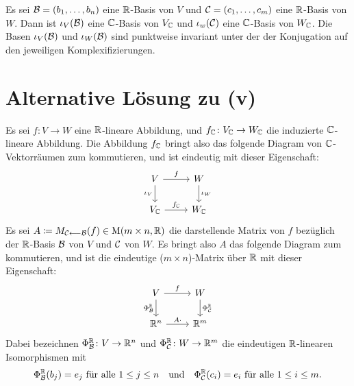 \documentclass[a4paper,10pt]{article}
\begin{document}
Es sei $\mathcal{B} = (b_1, \dotsc, b_n)$ eine $\mathbb{R}$-Basis von $V$ und $\mathcal{C} = (c_1, \dotsc, c_m)$ eine $\mathbb{R}$-Basis von $W$.
Dann ist $\iota_V(\mathcal{B})$ eine $\mathbb{C}$-Basis von $V_{\mathbb{C}}$ und $\iota_w(\mathcal{C})$ eine $\mathbb{C}$-Basis von $W_{\mathbb{C}}$.
Die Basen $\iota_V(\mathcal{B})$ und $\iota_W(\mathcal{B})$ sind punktweise invariant unter der der Konjugation auf den jeweiligen Komplexifizierungen.











\section{Alternative Lösung zu (v)}

Es sei $f \colon V \to W$ eine $\mathbb{R}$-lineare Abbildung, und $f_{\mathbb{C}} \colon V_{\mathbb{C}} \to W_{\mathbb{C}}$ die induzierte $\mathbb{C}$-lineare Abbildung.
Die Abbildung $f_{\mathbb{C}}$ bringt also das folgende Diagram von $\mathbb{C}$-Vektorräumen zum kommutieren, und ist eindeutig mit dieser Eigenschaft:
\[
  \begin{tikzcd}
      V       \arrow[r, "f"]      \arrow[d, "\iota_V"']
    & W                           \arrow[d, "\iota_W"]
    \\
      V_\Cbb  \arrow[r, "f_\Cbb"]
    & W_\Cbb
  \end{tikzcd}
\]
Es sei $A \coloneqq M_{\mathcal{C} \longleftarrow \mathcal{B}}(f) \in \operatorname{M}(m \times n, \mathbb{R})$ die darstellende Matrix von $f$ bezüglich der $\mathbb{R}$-Basis $\mathcal{B}$ von $V$ und $\mathcal{C}$ von $W$.
Es bringt also $A$ das folgende Diagram zum kommutieren, und ist die eindeutige ($m \times n$)-Matrix über $\mathbb{R}$ mit dieser Eigenschaft:
\[
  \begin{tikzcd}
      V      \arrow[r, "f"]       \arrow[d, "\Phi^\Rbb_\mc{B}"']
    & W                           \arrow[d, "\Phi^\Rbb_\mc{C}"]
    \\
      \Rbb^n \arrow[r, "A \cdot"]
    & \Rbb^m
  \end{tikzcd}
\]
Dabei bezeichnen $\Phi^{\mathbb{R}}_{\mathcal{B}} \colon V \to \mathbb{R}^n$ und $\Phi^{\mathbb{R}}_{\mathcal{C}} \colon W \to \mathbb{R}^m$ die eindeutigen $\mathbb{R}$-linearen Isomorphismen mit
\[
  \text{$\Phi^{\mathbb{R}}_{\mathcal{B}}(b_j) = e_j$ für alle $1 \leq j \leq n$}
  \quad\text{und}\quad
  \text{$\Phi^{\mathbb{R}}_{\mathcal{C}}(c_i) = e_i$ für alle $1 \leq i \leq m$}.
\]
\end{document}
